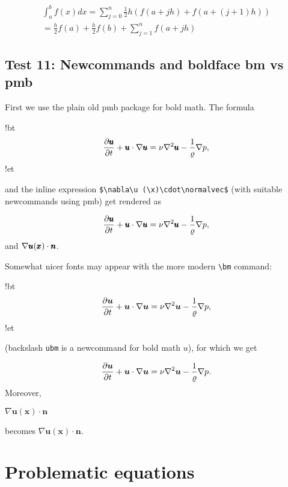 \documentclass[%
oneside,                 %
final,                   %
10pt]{article}
\begin{document}
\begin{equation}
\begin{split}
\int_a^b f(x)dx = \sum_{j=0}^{n} \frac{1}{2} h(f(a+jh) +
f(a+(j+1)h)) \\ 
=\frac{h}{2}f(a) + \frac{h}{2}f(b) + \sum_{j=1}^n f(a+jh)
\end{split}
\end{equation}

\subsection{Test 11: Newcommands and boldface bm vs pmb}

First we use the plain old pmb package for bold math. The formula







\blatexcod
!bt
\[ \frac{\partial\pmb{u}}{\partial t} +
\pmb{u}\cdot\nabla\pmb{u} = \nu\nabla^2\pmb{u} -
\frac{1}{\varrho}\nabla p,\]
!et

\elatexcod

and the inline expression \Verb!$\nabla\u (\x)\cdot\normalvec$!
(with suitable newcommands using pmb)
get rendered as

\[ \frac{\partial\pmb{u}}{\partial t} +
\pmb{u}\cdot\nabla\pmb{u} = \nu\nabla^2\pmb{u} -
\frac{1}{\varrho}\nabla p,\]
and $\nabla\pmb{u} (\pmb{x})\cdot\pmb{n}$.

Somewhat nicer fonts may appear with the more modern \Verb!\bm! command:







\blatexcod
!bt
\[ \frac{\partial\bm{u}}{\partial t} +
\bm{u}\cdot\nabla\bm{u} = \nu\nabla^2\bm{u} -
\frac{1}{\varrho}\nabla p,\]
!et

\elatexcod

(backslash \texttt{ubm} is a newcommand for bold math $u$), for which we get

\[ \frac{\partial\bm{u}}{\partial t} +
\bm{u}\cdot\nabla\bm{u} = \nu\nabla^2\bm{u} -
\frac{1}{\varrho}\nabla p.\]
Moreover,



\bdat
$\nabla\bm{u}(\bm{x})\cdot\bm{n}$

\edat

becomes $\nabla\bm{u}(\bm{x})\cdot\bm{n}$.

\section{Problematic equations}
\end{document}
